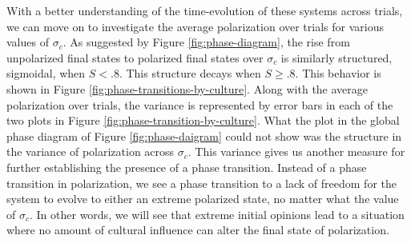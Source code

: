 \documentclass[11pt,letterpaper]{article}
\newcommand{\sigc}{\ensuremath{\sigma_c}}
\begin{document}
With a better understanding of the time-evolution of these systems across trials,
we can move on to investigate the average polarization over trials for
various values of $\sigc$. As suggested by Figure \ref{fig:phase-diagram}, 
the rise from unpolarized final states to polarized final states over $\sigc$
is similarly structured, sigmoidal, when $S < .8$. This structure decays
when $S \geq .8$. This behavior is shown in Figure \ref{fig:phase-transitions-by-culture}.
Along with the average polarization over trials, the variance is represented
by error bars in each of the two plots in Figure \ref{fig:phase-transition-by-culture}.
What the plot in the global phase diagram of Figure \ref{fig:phase-daigram}
could not show was the structure in the variance of polarization across $\sigc$.
This variance gives us another measure for further establishing the presence
of a phase transition. Instead of a phase transition in polarization, we 
see a phase transition to a lack of freedom for the system to evolve to either
an extreme polarized state, no matter what the value of $\sigc$. In other words,
we will see that extreme initial opinions lead to a situation where no amount
of cultural influence can alter the final state of polarization.
\end{document}
